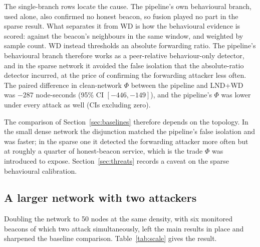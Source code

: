 \documentclass[pdflatex,sn-mathphys-num]{sn-jnl}%
\theoremstyle{thmstyleone}%
\theoremstyle{thmstyletwo}%
\theoremstyle{thmstylethree}%
\begin{document}
The single-branch rows locate the cause. The pipeline's own behavioural
branch, used alone, also confirmed no honest beacon, so fusion played no part
in the sparse result. What separates it from WD is how the behavioural
evidence is scored: against the beacon's neighbours in the same window, and
weighted by sample count. WD instead thresholds an absolute forwarding ratio.
The pipeline's behavioural branch therefore works as a peer-relative
behaviour-only detector, and in the sparse network it avoided the false isolation that the
absolute-ratio detector incurred, at the price of confirming the forwarding
attacker less often. The paired difference in clean-network $\Phi$ between the pipeline and LND+WD
was $-287$ node-seconds (95\% CI $[-446, -149]$), and the pipeline's $\Phi$
was lower under every attack as well (CIs excluding zero).

The comparison of Section~\ref{sec:baselines} therefore depends on the
topology. In the small dense network the disjunction matched the pipeline's
false isolation and was faster; in the sparse one it detected the forwarding
attacker more often but at roughly a quarter of honest-beacon service, which
is the trade $\Phi$ was introduced to expose. Section~\ref{sec:threats}
records a caveat on the sparse behavioural calibration.

\subsection{A larger network with two attackers}
\label{sec:scale}

Doubling the network to 50 nodes at the same density, with six monitored
beacons of which two attack simultaneously, left the main results in place
and sharpened the baseline comparison. Table~\ref{tab:scale} gives the
result.
\end{document}
